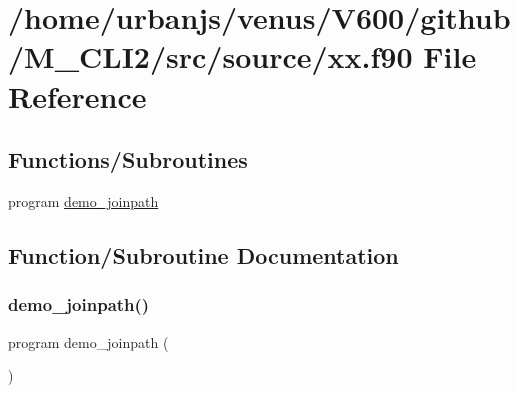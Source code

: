 \hypertarget{xx_8f90}{}\section{/home/urbanjs/venus/\+V600/github/\+M\+\_\+\+C\+L\+I2/src/source/xx.f90 File Reference}
\label{xx_8f90}
\subsection*{Functions/\+Subroutines}
\begin{DoxyCompactItemize}
\item 
program \mbox{\hyperlink{xx_8f90_ac93e12e4518e226a686709513356c338}{demo\+\_\+joinpath}}
\end{DoxyCompactItemize}


\subsection{Function/\+Subroutine Documentation}
\mbox{\label{xx_8f90_ac93e12e4518e226a686709513356c338}} 
\subsubsection{\texorpdfstring{demo\+\_\+joinpath()}{demo\_joinpath()}}
{\footnotesize\ttfamily program demo\+\_\+joinpath (\begin{DoxyParamCaption}{ }\end{DoxyParamCaption})}


